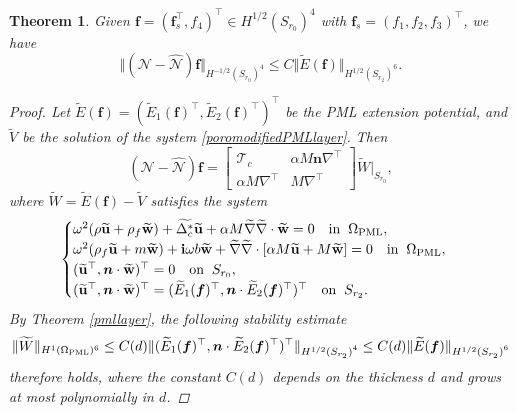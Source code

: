 \documentclass[11pt]{article}
\newcommand{\Om}{\Omega}
\newcommand{\De}{\Delta}
\newcommand{\wid}{\widetilde}
\newcommand{\bs}{\boldsymbol}
\newcommand{\PML}{{\rm PML}}
\newtheorem{theorem}{Theorem}[section]
\begin{document}
\begin{theorem}
Given $\bs{f}=(\bs{f}_s^{\top},f_4)^{\top}\in H^{1/2}(S_{r_0})^4$ with $\bs{f}_s=(f_1,f_2,f_3)^{\top}$, we have
\begin{equation}\label{porodtn_error}
\Vert (\mathcal{N}-\hat{\mathcal{N}})\bs{f}\Vert_{{ H^{-1/2}( S_{r_0})}^4}
\leq C\Vert \wid{E}(\bs{f})\Vert_{{ H^{1/2}( S_{r_2})}^6} .
\end{equation}
\begin{proof}
Let $\wid{E}(\bs{f})=(\wid{E}_1(\bs{f})^{\top},\wid{E}_2(\bs{f})^{\top})^{\top}$ 
be the PML extension potential, and $\wid{V}$ be the solution of the system 
\eqref{poromodifiedPMLlayer}.
Then 
$$(\mathcal{N}-\hat{\mathcal{N}})\bs{f}=\begin{bmatrix}
\mathcal{T}_c & \alpha M \bs{n} \nabla^{\top} \\
\alpha M \nabla^{\top} &  M \nabla^{\top}
\end{bmatrix}\wid{W}|_{S_{r_0}},$$
where $\wid{W}=\wid{E}(\bs{f})-\wid{V}$ satisfies the system
\begin{equation}\label{poromodifiedPMLlayeroutb}
\begin{cases}
\omega^2(\rho\wid{\mathbf{u}} +\rho_f \wid{\mathbf{w}})+\wid{\De_c^*}\wid{\mathbf{u}} 
+\alpha M\wid{\nabla} \wid{\nabla}\cdot  \wid{\mathbf{w}}=0\quad {\rm in}\;\;\Om_{\PML},\\
\omega^2(\rho_f \wid{\mathbf{u}}+m \wid{\mathbf{w}})+{\bf{i}}\omega b \wid{\mathbf{w}}
+\wid{\nabla} \wid{\nabla} \cdot [\alpha M \wid{\mathbf{u}}+ M \wid{\mathbf{w}}]
=0 \quad {\rm in}\;\;\Om_{\PML},\\
(\wid{\mathbf{u}}^{\top},{\bs n}\cdot \wid{\mathbf{w}})^{\top}=0\quad {\rm on} \;\;S_{r_0},\\
(\wid{\mathbf{u}}^{\top},{\bs n}\cdot \wid{\mathbf{w}})^{\top} =(\wid{E}_1(\bs{f})^{\top},
{\bs n}\cdot\wid{E}_2(\bs{f})^{\top})^{\top}\quad {\rm on} \;\;S_{r_2}.
\end{cases}
\end{equation} 
By Theorem \ref{pmllayer}, the following stability estimate 
\begin{equation}\label{W_stability}
\Vert \wid{W} \Vert_{H^1(\Om_{\PML})^6}\leq C(d) \Vert (\wid{E}_1(\bs{f})^{\top},{\bs n}
\cdot\wid{E}_2(\bs{f})^{\top})^{\top}\Vert_{{ H^{1/2}(S_{r_2})}^4} \leq C(d) 
\Vert \wid{E}(\bs{f})\Vert_{{ H^{1/2}(S_{r_2})}^6}
\end{equation}
therefore holds, where the constant $C(d)$ depends on the thickness $d$ and grows at most polynomially in $d$.


\end{proof}
\end{theorem}
\end{document}
